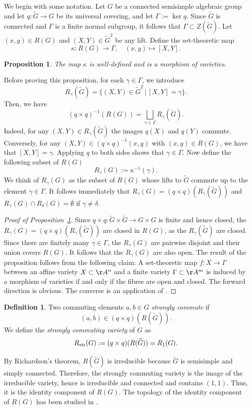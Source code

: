 \documentclass[12pt, a4paper, oneside]{amsart}
\theoremstyle{plain} %
\newtheorem{proposition}[theorem]{Proposition}
\theoremstyle{definition} %
\newtheorem{definition}[theorem]{Definition}
\theoremstyle{remark} %
\begin{document}
We begin with some notation. Let $G$ be a connected semisimple algebraic group and let $q:\widetilde{G}\to G$ be its universal covering, and let $\Gamma:=\ker q$. Since $\widetilde{G}$ is connected and $\Gamma$ is a finite normal subgroup, it follows that $\Gamma\subset Z(\widetilde{G})$. Let $(x,y)\in R(G)$ and $(X,Y)\in \widetilde{G}^2$ be any lift. Define the set-theoretic map
\[\kappa: R(G)\longrightarrow \Gamma,\quad (x,y)\longmapsto [X,Y].\]
\begin{proposition}\label{prop:kappa}
The map $\kappa$ is well-defined and is a morphism of varieties.
\end{proposition}
Before proving this proposition, for each $\gamma\in \Gamma$, we introduce
\[R_\gamma(\widetilde{G}) = \{(X,Y)\in \widetilde{G}^2\,|\,[X,Y] = \gamma\}.\]
Then, we have
\[(q\times q)^{-1}(R(G)) =\bigsqcup_{\gamma\in \Gamma}R_\gamma(\widetilde{G}).\]
Indeed, for any $(X,Y)\in R_\gamma(\widetilde{G})$ the images $q(X)$ and $q(Y)$ commute. Conversely, for any $(X,Y)\in (q\times q)^{-1}(x,y)$ with $(x,y)\in R(G)$, we have that $[X,Y]=\gamma$. Applying $q$ to both sides shows that $\gamma\in \Gamma$. Now define the following subset of $R(G)$
\[R_\gamma(G) := \kappa^{-1}(\gamma).\]
We think of $R_\gamma(G)$ as the subset of $R(G)$ whose lifts to $\widetilde{G}$ commute up to the element $\gamma\in \Gamma$. It follows immediately that $R_\gamma(G) = (q\times q)(R_\gamma(\widetilde{G}))$ and $R_\gamma(G)\cap R_\delta(G) = \emptyset$ if $\gamma\neq \delta$. 
\begin{proof}[Proof of Proposition~\ref{prop:kappa}]
Since $q\times q:\widetilde{G}\times \widetilde{G}\to G\times G$ is finite and hence closed, the $R_\gamma(G)=(q\times q)(R_\gamma(\widetilde{G}))$ are closed in $R(G)$, as the $R_\gamma(\widetilde{G})$ are closed. Since there are finitely many $\gamma\in \Gamma$, the $R_\gamma(G)$ are pairwise disjoint and their union covers $R(G)$. It follows that the $R_\gamma(G)$ are also open. The result of the proposition follows from the following claim: A set-theoretic map $f:X\to \Gamma$ between an affine variety $X\subset\AA^n$ and a finite variety $\Gamma\subset \AA^m$ is induced by a morphism of varieties if and only if the fibres are open and closed. The forward direction is obvious. The converse is an application of \cite[II, Ex 2.19]{Har77}. 
\end{proof}
\begin{definition}\label{def:str}
Two commuting elements $a,b\in G$ \emph{strongly commute} if 
\[(a,b)\in (q\times q)(R(\widetilde{G})).\]
We define the \emph{strongly commuting variety} of $G$ as 
\[R_{\rm str}(G) := (q\times q) (R(\widetilde{G}))=R_1(G).\]
\end{definition}
By Richardson's theorem, $R(\widetilde{G})$ is irreducible because $\widetilde{G}$ is semisimple and simply connected. Therefore, the strongly commuting variety is the image of the irreducible variety, hence is irreducible and connected and contains $(1,1)$. Thus, it is the identity component of $R(G)$. The topology of the identity component of $R(G)$ has been studied in \cite{Bai07,GPS12,PS13}.
\end{document}
